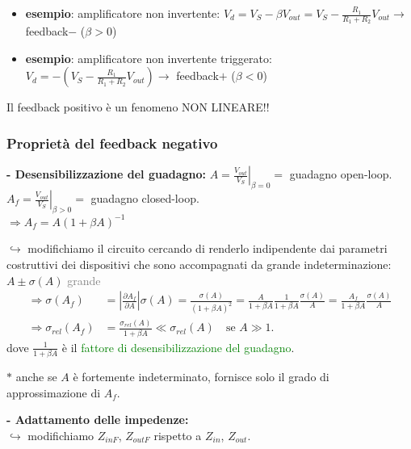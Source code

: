 \documentclass[11pt,a4paper]{report}
\begin{document}
\newpage


\begin{itemize}
    \item \textbf{esempio}: amplificatore non invertente: $V_d = V_S - \beta V_{out} = V_S - \frac{R_1}{R_1 + R_2} V_{out} \rightarrow$ feedback$-$ ($\beta > 0$)
    \item \textbf{esempio}: amplificatore non invertente triggerato: $V_d = - (V_S - \frac{R_1}{R_1 + R_2} V_{out}) \rightarrow$ feedback$+$ ($\beta < 0$)
\end{itemize}

\begin{important}
Il feedback positivo è un fenomeno NON LINEARE!!
\end{important}

\subsubsection*{Proprietà del feedback negativo}

\textbf{- Desensibilizzazione del guadagno:} 
$A = \left.\frac{V_{out}}{V_S}\right|_{\beta=0} = $ guadagno open-loop. \\
$A_f = \left.\frac{V_{out}}{V_S}\right|_{\beta>0} = $ guadagno closed-loop. \\
$\Rightarrow A_f = A (1 + \beta A)^{-1}$

$\hookrightarrow$ modifichiamo il circuito cercando di renderlo indipendente dai parametri costruttivi dei dispositivi che sono accompagnati da grande indeterminazione: $A \pm \sigma(A)$ \textcolor{gray}{grande}
\begin{align*}
    \Rightarrow \sigma(A_f) &= \left| \frac{\partial A_f}{\partial A} \right| \sigma(A) = \frac{\sigma(A)}{(1 + \beta A)^2} = \frac{A}{1 + \beta A} \frac{1}{1 + \beta A} \frac{\sigma(A)}{A} = \frac{A_f}{1 + \beta A} \frac{\sigma(A)}{A} \\
    \Rightarrow \sigma_{rel}(A_f) &= \frac{\sigma_{rel}(A)}{1 + \beta A} \ll \sigma_{rel}(A) \quad \text{se } A \gg 1.
\end{align*}
dove $\frac{1}{1 + \beta A}$ è il \textcolor{green}{fattore di desensibilizzazione del guadagno}.

$\ast$ anche se $A$ è fortemente indeterminato, fornisce solo il grado di approssimazione di $A_f$.

\textbf{- Adattamento delle impedenze:} \\
$\hookrightarrow$ modifichiamo $Z_{in F}$, $Z_{out F}$ rispetto a $Z_{in}$, $Z_{out}$.
\end{document}
